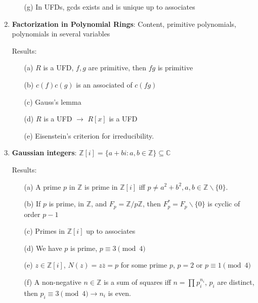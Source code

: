\documentclass{article}
\begin{document}
\begin{enumerate}
\begin{enumerate}
		\item [(g)] In UFDs, gcds exists and is unique up to associates 
	\end{enumerate}

	\item \textbf{Factorization in Polynomial Rings}: Content, primitive polynomials, polynomials in several variables 

	Results:
	\begin{enumerate}
		\item [(a)] $R$ is a UFD, $f, g$ are primitive, then $fg$ is primitive	

		\item [(b)] $c(f)c(g)$ is an associated of $c(fg)$ 

		\item [(c)] Gauss's lemma 

		\item [(d)] $R$ is a UFD $\rightarrow$ $R[x]$ is a UFD 

		\item [(e)] Eisenstein's criterion for irreducibility.
	\end{enumerate}

	\item \textbf{Gaussian integers}: $\mathbb{Z}[i] = \{a + bi : a, b \in \mathbb{Z}\} \subseteq \mathbb{C}$
	
	Results:
	\begin{enumerate}
		\item [(a)] A prime $p$ in $\mathbb{Z}$ is prime in $\mathbb{Z}[i]$ iff $p \neq a^{2} + b^{2}, a, b \in \mathbb{Z}\backslash\{0\}$.

		\item [(b)] If $p$ is prime, in $\mathbb{Z}$, and $F_{p} = \mathbb{Z}/p\mathbb{Z}$, then $F^{*}_{p} = F_{p}\backslash\{0\}$ is cyclic of order $p - 1$

		\item [(c)] Primes in $\mathbb{Z}[i]$ up to associates

		\item [(d)] We have $p$ is prime, $p \equiv 3 \pmod{4}$

		\item [(e)] $z \in \mathbb{Z}[i]$, $N(z) = z \overline{z} = p$ for some prime $p$, $p = 2$ or $p \equiv 1 \pmod{4}$

		\item [(f)] A non-negative $n \in \mathbb{Z}$ is a sum of squares iff $n = \prod_{}^{} p_{i}^{n_{i}}$, $p_{i}$ are distinct, then $p_{i} \equiv 3 \pmod{4} \rightarrow n_{i}$ is even.
	\end{enumerate}


\end{enumerate}
\end{document}

